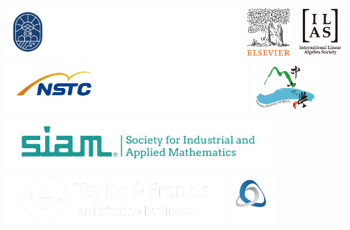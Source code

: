 \documentclass[a4paper]{article}
\begin{document}
\vfill

\begin{tcolorbox}
\begin{center}
\includegraphics[height=2cm]{logomap/01EDB}
\hfil
\includegraphics[height=2cm]{logomap/02ELSEVIER}
\hfil
\includegraphics[height=2cm]{logomap/03ILAS}
\hfil
\includegraphics[height=2cm]{logomap/04NSTC}
\hfil
\includegraphics[height=2cm]{logomap/05NSYSU}
\hfil
\includegraphics[height=2cm]{logomap/06SIAM}
\hfil
\includegraphics[height=2cm]{logomap/07T&F}
\hfil
\includegraphics[height=2cm]{logomap/08TMS}
\end{center}
\end{tcolorbox}
\end{document}

